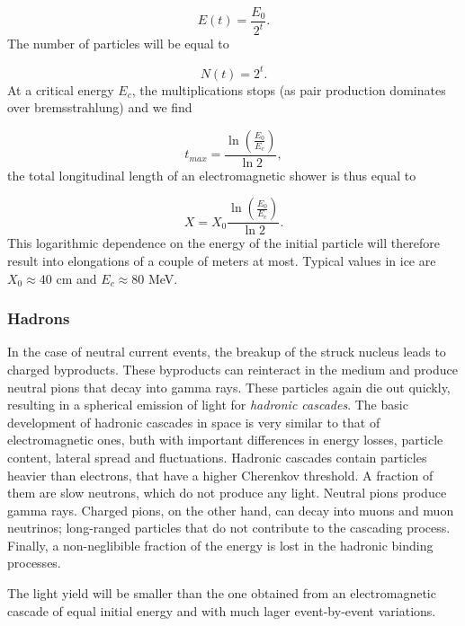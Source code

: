 \begin{equation}
E(t) = \frac{E_0}{2^t}.
\end{equation}
The number of particles will be equal to

\begin{equation}
N(t) = 2^t.
\end{equation}
At a critical energy $E_c$, the multiplications stops (as pair production dominates over bremsstrahlung) and we find

\begin{equation}
t_{max} = \frac{\ln\left(\frac{E_0}{E_c}\right)}{\ln 2},
\end{equation}
the total longitudinal length of an electromagnetic shower is thus equal to

\begin{equation}
X = X_0 \frac{\ln\left(\frac{E_0}{E_c}\right)}{\ln 2}.
\end{equation}
This logarithmic dependence on the energy of the initial particle will therefore result into elongations of a couple of meters at most. Typical values in ice are $X_0 \approx 40$ cm and $E_c \approx 80$ MeV.

\subsubsection{Hadrons}
In the case of neutral current events, the breakup of the struck nucleus leads to charged byproducts. These byproducts can reinteract in the medium and produce neutral pions that decay into gamma rays. These particles again die out quickly, resulting in a spherical emission of light for \textit{hadronic cascades}. The basic development of hadronic cascades in space is very similar to that of electromagnetic ones, buth with important differences in energy losses, particle content, lateral spread and fluctuations. Hadronic cascades contain particles heavier than electrons, that have a higher Cherenkov threshold. A fraction of them are slow neutrons, which do not produce any light. Neutral pions produce gamma rays. Charged pions, on the other hand, can decay into muons and muon neutrinos; long-ranged particles that do not contribute to the cascading process. Finally, a non-neglibible fraction of the energy is lost in the hadronic binding processes.

The light yield will be smaller than the one obtained from an electromagnetic cascade of equal initial energy and with much lager event-by-event variations. 


